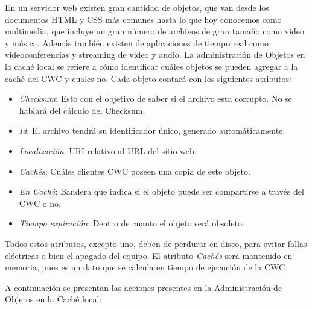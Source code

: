 En un servidor web existen gran cantidad de objetos, que van desde los documentos HTML y CSS más comunes hasta lo que hoy conocemos como multimedia, que incluye un gran número de archivos de gran tamaño como video y música. Además también existen de aplicaciones de tiempo real como videoconferencias y streaming de video y audio. La administración de Objetos en la caché local se refiere a cómo identificar cuáles objetos se pueden agregar a la caché del CWC y cuales no. Cada objeto contará con los siguientes atributos:

\begin{itemize}
\item \textit{Checksum}: Esto con el objetivo de saber si el archivo esta corrupto. No se hablará del cálculo del Checksum.
\item \textit{Id}: El archivo tendrá su identificador único, generado automáticamente.
\item \textit{Localización}: URI relativo al URL del sitio web.
\item \textit{Cachés}: Cuáles clientes CWC poseen una copia de este objeto. 
\item \textit{En Caché}: Bandera que indica si el objeto puede ser compartirse a través del CWC o no.
\item \textit{Tiempo expiración}: Dentro de cuanto el objeto será obsoleto. 
\end{itemize}

Todos estos atributos, excepto uno, deben de perdurar en disco, para evitar fallas eléctricas o bien el apagado del equipo. El atributo \textit{Cachés} será mantenido en memoria, pues es un dato que se calcula en tiempo de ejecución de la CWC.

A continuación se presentan las acciones presentes en la Administración de Objetos en la Caché local:

